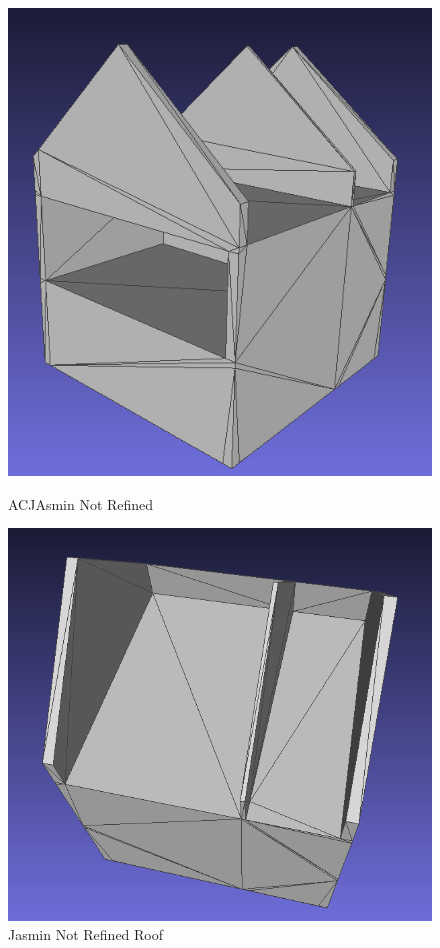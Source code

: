 \documentclass[10pt]{beamer}
\begin{document}
\begin{frame}
\begin{figure}
\begin{minipage}[b]{0.40\textwidth}
    \centering
    \includegraphics[width=\textwidth]{../image/ACJasmin_not_refined.png}
    \caption{ACJAsmin Not Refined}
  \end{minipage}\hfill
  \begin{minipage}[b]{0.40\textwidth}
    \centering
    \includegraphics[width=\textwidth]{../image/Jasmin_not_refined_roof.png}
    \caption{Jasmin Not Refined Roof}
  \end{minipage}
\end{figure}

\end{frame}
\end{document}
